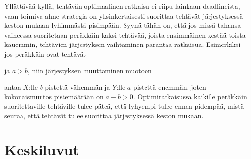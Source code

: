 Yllättävää kyllä, tehtävän optimaalinen ratkaisu
ei riipu lainkaan deadlineista,
vaan toimiva ahne strategia on
yksinkertaisesti
suorittaa tehtävät järjestyksessä keston mukaan
lyhimmästä pisimpään.
Syynä tähän on, että jos missä tahansa vaiheessa
suoritetaan peräkkäin kaksi tehtävää,
joista ensimmäinen kestää toista kauemmin,
tehtävien järjestyksen vaihtaminen parantaa ratkaisua.
Esimerkiksi jos peräkkäin ovat tehtävät
\begin{center}
\end{center}
ja $a>b$, niin järjestyksen muuttaminen muotoon
\begin{center}
\end{center}
antaa $X$:lle $b$ pistettä vähemmän ja $Y$:lle $a$ pistettä enemmän,
joten kokonaismuutos pistemäärään on $a-b > 0$.
Optimiratkaisussa
kaikille peräkkäin suoritettaville tehtäville
tulee päteä, että lyhyempi tulee ennen pidempää,
mistä seuraa, että tehtävät tulee suorittaa
järjestyksessä keston mukaan.

\section{Keskiluvut}

